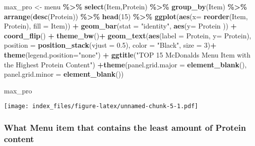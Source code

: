 \documentclass[
]{article}
\newenvironment{Shaded}{\begin{snugshade}}{\end{snugshade}}
\newcommand{\AttributeTok}[1]{\textcolor[rgb]{0.13,0.29,0.53}{#1}}
\newcommand{\DecValTok}[1]{\textcolor[rgb]{0.00,0.00,0.81}{#1}}
\newcommand{\FloatTok}[1]{\textcolor[rgb]{0.00,0.00,0.81}{#1}}
\newcommand{\FunctionTok}[1]{\textcolor[rgb]{0.13,0.29,0.53}{\textbf{#1}}}
\newcommand{\NormalTok}[1]{#1}
\newcommand{\OtherTok}[1]{\textcolor[rgb]{0.56,0.35,0.01}{#1}}
\newcommand{\SpecialCharTok}[1]{\textcolor[rgb]{0.81,0.36,0.00}{\textbf{#1}}}
\newcommand{\StringTok}[1]{\textcolor[rgb]{0.31,0.60,0.02}{#1}}
\begin{document}
\begin{Shaded}
\begin{Highlighting}[]
\NormalTok{max\_pro }\OtherTok{\textless{}{-}}\NormalTok{ menu }\SpecialCharTok{\%\textgreater{}\%} 
  \FunctionTok{select}\NormalTok{(Item,Protein) }\SpecialCharTok{\%\textgreater{}\%}  
  \FunctionTok{group\_by}\NormalTok{(Item) }\SpecialCharTok{\%\textgreater{}\%} 
  \FunctionTok{arrange}\NormalTok{(}\FunctionTok{desc}\NormalTok{(Protein)) }\SpecialCharTok{\%\textgreater{}\%} 
  \FunctionTok{head}\NormalTok{(}\DecValTok{15}\NormalTok{) }\SpecialCharTok{\%\textgreater{}\%} 
  \FunctionTok{ggplot}\NormalTok{(}\FunctionTok{aes}\NormalTok{(}\AttributeTok{x=} \FunctionTok{reorder}\NormalTok{(Item, }
\NormalTok{                        Protein),}
             \AttributeTok{fill =}\NormalTok{ Item)) }\SpecialCharTok{+} 
  \FunctionTok{geom\_bar}\NormalTok{(}\AttributeTok{stat =} \StringTok{"identity"}\NormalTok{,}
           \FunctionTok{aes}\NormalTok{(}\AttributeTok{y=}\NormalTok{ Protein )) }\SpecialCharTok{+}
  \FunctionTok{coord\_flip}\NormalTok{() }\SpecialCharTok{+}
  \FunctionTok{theme\_bw}\NormalTok{()}\SpecialCharTok{+} 
  \FunctionTok{geom\_text}\NormalTok{(}\FunctionTok{aes}\NormalTok{(}\AttributeTok{label =}\NormalTok{ Protein, }
                \AttributeTok{y=}\NormalTok{ Protein),}
            \AttributeTok{position =} \FunctionTok{position\_stack}\NormalTok{(}\AttributeTok{vjust =} \FloatTok{0.5}\NormalTok{),}
            \AttributeTok{color =} \StringTok{"Black"}\NormalTok{,}
            \AttributeTok{size =} \DecValTok{3}\NormalTok{)}\SpecialCharTok{+}
  \FunctionTok{theme}\NormalTok{(}\AttributeTok{legend.position=}\StringTok{"none"}\NormalTok{) }\SpecialCharTok{+}
  \FunctionTok{ggtitle}\NormalTok{(}\StringTok{"TOP 15 McDonald\textquotesingle{}s Menu Item with the Highest Protein Content"}\NormalTok{) }\SpecialCharTok{+}\FunctionTok{theme}\NormalTok{(}\AttributeTok{panel.grid.major =} \FunctionTok{element\_blank}\NormalTok{(), }\AttributeTok{panel.grid.minor =} \FunctionTok{element\_blank}\NormalTok{())}

\NormalTok{max\_pro}
\end{Highlighting}
\end{Shaded}

\texttt{[image: index\_files/figure-latex/unnamed-chunk-5-1.pdf]}

\hypertarget{what-menu-item-that-contains-the-least-amount-of-protein-content}{%
\subsubsection{What Menu item that contains the least amount of Protein
content}\label{what-menu-item-that-contains-the-least-amount-of-protein-content}}
\end{document}
